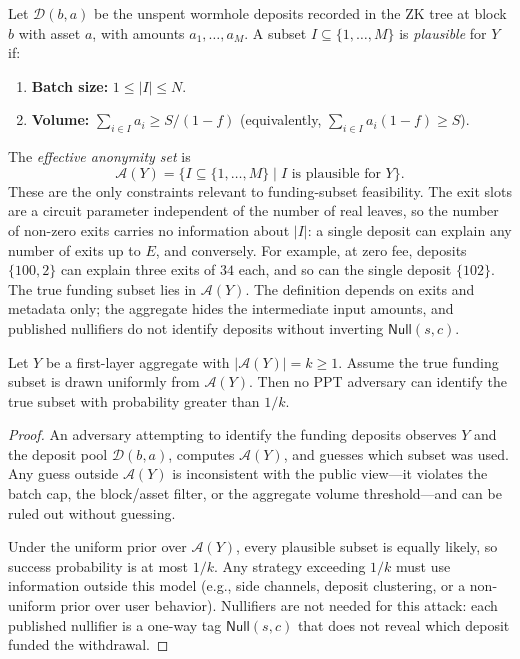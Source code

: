 \documentclass{iacrcc}
\newcommand{\Null}{\mathsf{Null}}
\begin{document}
\begin{definition}
\label{def:anonymity-set}
Let \(\mathcal{D}(b,a)\) be the unspent wormhole deposits recorded in the ZK tree at block \(b\) with asset \(a\), with amounts \(a_1, \ldots, a_M\). A subset \(I \subseteq \{1,\ldots,M\}\) is \emph{plausible} for \(Y\) if:
\begin{enumerate}[label=(\roman*),leftmargin=2em]
    \item \textbf{Batch size:} \(1 \leq |I| \leq N\).
    \item \textbf{Volume:} \(\sum_{i \in I} a_i \geq S/(1-f)\) (equivalently, \(\sum_{i \in I} a_i(1-f) \geq S\)).
\end{enumerate}
The \emph{effective anonymity set} is
\[
\mathcal{A}(Y) = \{ I \subseteq \{1,\ldots,M\} \mid I \text{ is plausible for } Y \}.
\]
These are the only constraints relevant to funding-subset feasibility. The exit slots are a circuit parameter independent of the number of real leaves, so the number of non-zero exits carries no information about \(|I|\): a single deposit can explain any number of exits up to \(E\), and conversely. For example, at zero fee, deposits \(\{100,2\}\) can explain three exits of \(34\) each, and so can the single deposit \(\{102\}\). The true funding subset lies in \(\mathcal{A}(Y)\). The definition depends on exits and metadata only; the aggregate hides the intermediate input amounts, and published nullifiers do not identify deposits without inverting \(\Null(s,c)\).
\end{definition}

\begin{theorem}
\label{thm:unlinkability}
Let \(Y\) be a first-layer aggregate with \(|\mathcal{A}(Y)| = k \geq 1\). Assume the true funding subset is drawn uniformly from \(\mathcal{A}(Y)\). Then no PPT adversary can identify the true subset with probability greater than \(1/k\).
\end{theorem}

\begin{proof}
An adversary attempting to identify the funding deposits observes \(Y\) and the deposit pool \(\mathcal{D}(b,a)\), computes \(\mathcal{A}(Y)\), and guesses which subset was used. Any guess outside \(\mathcal{A}(Y)\) is inconsistent with the public view---it violates the batch cap, the block/asset filter, or the aggregate volume threshold---and can be ruled out without guessing.

Under the uniform prior over \(\mathcal{A}(Y)\), every plausible subset is equally likely, so success probability is at most \(1/k\). Any strategy exceeding \(1/k\) must use information outside this model (e.g., side channels, deposit clustering, or a non-uniform prior over user behavior). Nullifiers are not needed for this attack: each published nullifier is a one-way tag \(\Null(s,c)\) that does not reveal which deposit funded the withdrawal.
\end{proof}
\end{document}
